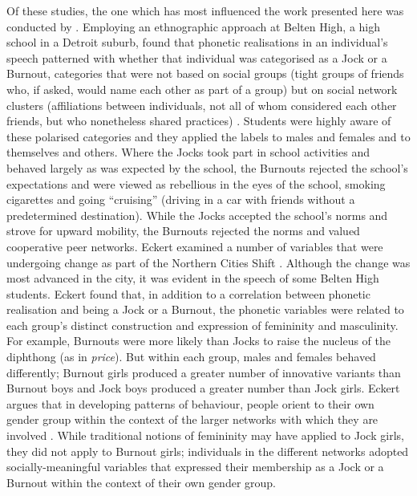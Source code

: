 Of these studies, the one which has most influenced the work presented here was conducted by \citet{eckert1989,eckert2000}. Employing an ethnographic approach at Belten High, a high school in a Detroit suburb, \citet{eckert1989,eckert2000} found that pho\-ne\-tic realisations in an individual's speech patterned with whe\-ther that individual was ca\-tegorised as a Jock or a Burnout, categories that were not based on social groups (tight groups of friends who, if asked, would name each other as part of a group) but on social network clusters (affiliations between individuals, not all of whom considered each other friends, but who nonetheless shared practices) \citep[11]{eckert2005}. Students were highly aware of these polarised categories and they applied the labels to males and females and to themselves and others. Where the Jocks took part in school activities and behaved largely as was expected by the school, the Burnouts rejected the school's expectations and were viewed as rebellious in the eyes of the school, smoking cigarettes and going ``cruising'' (driving in a car with friends without a predetermined destination). While the Jocks accepted the school's norms and strove for upward mobility, the Burnouts rejected the norms and valued cooperative peer networks. Eckert examined a number of variables that were undergoing change as part of the Northern Cities Shift \citep{labovyaegersteiner1972}. Although the change was most advanced in the city, it was evident in the speech of some Belten High students. Eckert found that, in addition to a correlation between phonetic realisation and being a Jock or a Burnout, the phonetic variables were related to each group's distinct construction and expression of femininity and masculinity. For example, Burnouts were more likely than Jocks to raise the nucleus of the diphthong  (as in \textit{price}). But within each group, males and females behaved differently; Burnout girls produced a greater number of innovative variants than Burnout boys and Jock boys produced a greater number than Jock girls. Eckert argues that in developing patterns of behaviour, people orient to their own gender group within the context of the larger networks with which they are involved \citep[122-123]{eckert2000}. While traditional notions of femininity may have applied to Jock girls, they did not apply to Burnout girls; individuals in the different networks adopted socially-meaningful variables that expressed their membership as a Jock or a Burnout within the context of their own gender group. 

